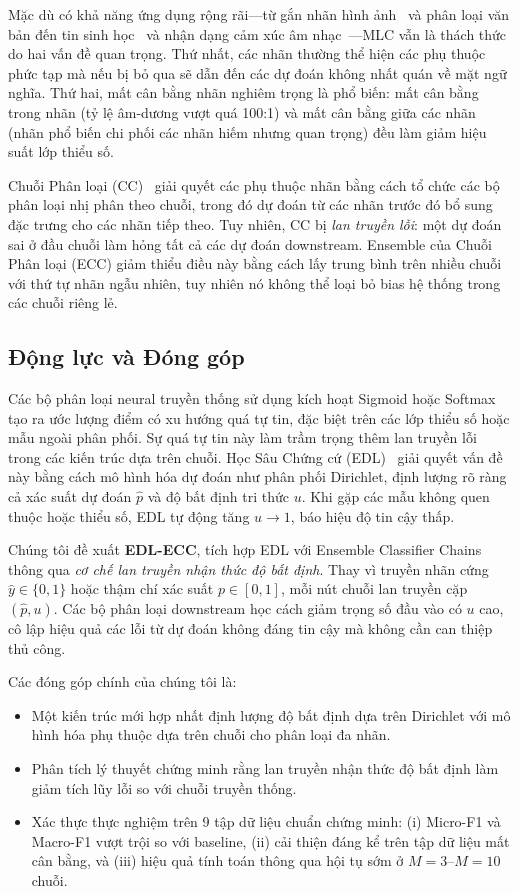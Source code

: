 \documentclass[conference]{IEEEtran}
\begin{document}
Mặc dù có khả năng ứng dụng rộng rãi—từ gắn nhãn hình ảnh~\cite{boutell2004learning} và phân loại văn bản đến tin sinh học~\cite{chou2001prediction} và nhận dạng cảm xúc âm nhạc~\cite{trohidis2008multilabel}—MLC vẫn là thách thức do hai vấn đề quan trọng. Thứ nhất, các nhãn thường thể hiện các phụ thuộc phức tạp mà nếu bị bỏ qua sẽ dẫn đến các dự đoán không nhất quán về mặt ngữ nghĩa. Thứ hai, mất cân bằng nhãn nghiêm trọng là phổ biến: mất cân bằng trong nhãn (tỷ lệ âm-dương vượt quá 100:1) và mất cân bằng giữa các nhãn (nhãn phổ biến chi phối các nhãn hiếm nhưng quan trọng) đều làm giảm hiệu suất lớp thiểu số.

Chuỗi Phân loại (CC)~\cite{read2011classifier} giải quyết các phụ thuộc nhãn bằng cách tổ chức các bộ phân loại nhị phân theo chuỗi, trong đó dự đoán từ các nhãn trước đó bổ sung đặc trưng cho các nhãn tiếp theo. Tuy nhiên, CC bị \textit{lan truyền lỗi}: một dự đoán sai ở đầu chuỗi làm hỏng tất cả các dự đoán downstream. Ensemble của Chuỗi Phân loại (ECC) giảm thiểu điều này bằng cách lấy trung bình trên nhiều chuỗi với thứ tự nhãn ngẫu nhiên, tuy nhiên nó không thể loại bỏ bias hệ thống trong các chuỗi riêng lẻ.

\subsection{Động lực và Đóng góp}

Các bộ phân loại neural truyền thống sử dụng kích hoạt Sigmoid hoặc Softmax tạo ra ước lượng điểm có xu hướng quá tự tin, đặc biệt trên các lớp thiểu số hoặc mẫu ngoài phân phối. Sự quá tự tin này làm trầm trọng thêm lan truyền lỗi trong các kiến trúc dựa trên chuỗi. Học Sâu Chứng cứ (EDL)~\cite{sensoy2018evidential} giải quyết vấn đề này bằng cách mô hình hóa dự đoán như phân phối Dirichlet, định lượng rõ ràng cả xác suất dự đoán $\hat{p}$ và độ bất định tri thức $u$. Khi gặp các mẫu không quen thuộc hoặc thiểu số, EDL tự động tăng $u \to 1$, báo hiệu độ tin cậy thấp.

Chúng tôi đề xuất \textbf{EDL-ECC}, tích hợp EDL với Ensemble Classifier Chains thông qua \textit{cơ chế lan truyền nhận thức độ bất định}. Thay vì truyền nhãn cứng $\hat{y} \in \{0,1\}$ hoặc thậm chí xác suất $p \in [0,1]$, mỗi nút chuỗi lan truyền cặp $(\hat{p}, u)$. Các bộ phân loại downstream học cách giảm trọng số đầu vào có $u$ cao, cô lập hiệu quả các lỗi từ dự đoán không đáng tin cậy mà không cần can thiệp thủ công.

Các đóng góp chính của chúng tôi là:
\begin{itemize}
    \item Một kiến trúc mới hợp nhất định lượng độ bất định dựa trên Dirichlet với mô hình hóa phụ thuộc dựa trên chuỗi cho phân loại đa nhãn.
    \item Phân tích lý thuyết chứng minh rằng lan truyền nhận thức độ bất định làm giảm tích lũy lỗi so với chuỗi truyền thống.
    \item Xác thực thực nghiệm trên 9 tập dữ liệu chuẩn chứng minh: (i) Micro-F1 và Macro-F1 vượt trội so với baseline, (ii) cải thiện đáng kể trên tập dữ liệu mất cân bằng, và (iii) hiệu quả tính toán thông qua hội tụ sớm ở $M=3$--$M=10$ chuỗi.
\end{itemize}
\end{document}

